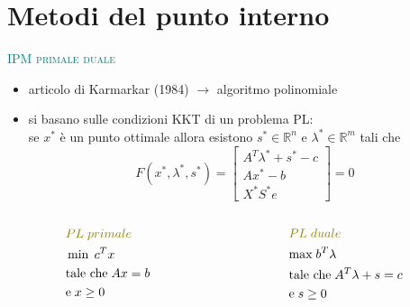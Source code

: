 
\section{Metodi del punto interno}

\begin{frame}[t]{\textcolor{teal}{\textsc{\LARGE IPM primale duale}}}

\pause
	\begin{itemize}
		\item articolo di Karmarkar (1984) %
		$\rightarrow$ algoritmo polinomiale
		\pause
		\item si basano sulle \textrm{condizioni KKT} di un problema PL:
		\pause\\[0.5 cm] \textrm{se $x^{*}$ è un punto ottimale allora esistono $s^{*}\in\mathbb{R}^{n}$ e $\lambda^{*}\in\mathbb{R}^{m}$ tali che}
		\begin{equation*}
		\mathit{F}(x^{*},\lambda^{*},s^{*})= \begin{bmatrix}
		A^{T}\lambda^{*}+s^{*}-c \\Ax^{*}-b \\X^{*}S^{*}e
		\end{bmatrix}=0
		\end{equation*}
		\end{itemize}
		\pause
	\begin{columns}
		\begin{column}{0.4\textwidth}
			\begin{equation*}
			\begin{split}
			&\textcolor{olive}{PL\; primale}\\
			&\min\;c^{T}x\\
			&\text{tale che\;}Ax= b\;\\&\text{e\;}x\geq0
			\end{split}
			\end{equation*}	
		\end{column}
		\begin{column}{0.4\textwidth}
			\begin{equation*}
			\begin{split}
			&\textcolor{olive}{PL\; duale}\\
			&\text{max\;}b^{T}\lambda\\
			&\text{tale che\;}A^{T}\lambda+s=c\\ &\text{e\;} s\geq0
			\end{split}
			\end{equation*}	
		\end{column}		
	\end{columns}
\end{frame}

